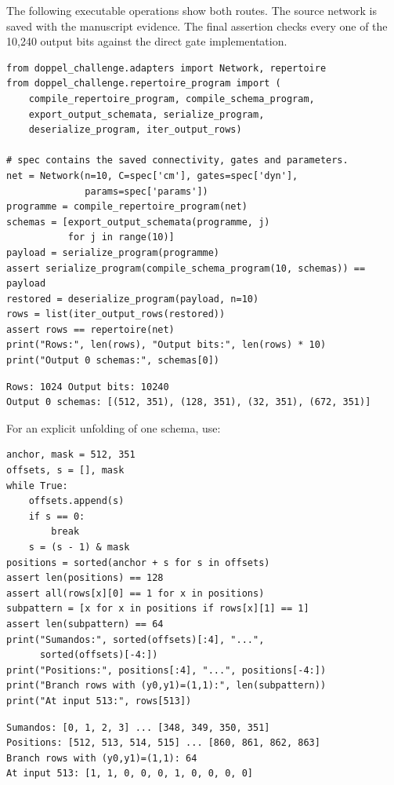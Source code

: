 \documentclass[11pt,a4paper]{article}
\begin{document}
\FloatBarrier
The following executable operations show both routes. The source network is
saved with the manuscript evidence. The final assertion checks every one of
the 10,240 output bits against the direct gate implementation.

\begin{minipage}{\linewidth}
\begin{lstlisting}
from doppel_challenge.adapters import Network, repertoire
from doppel_challenge.repertoire_program import (
    compile_repertoire_program, compile_schema_program,
    export_output_schemata, serialize_program,
    deserialize_program, iter_output_rows)

# spec contains the saved connectivity, gates and parameters.
net = Network(n=10, C=spec['cm'], gates=spec['dyn'],
              params=spec['params'])
programme = compile_repertoire_program(net)
schemas = [export_output_schemata(programme, j)
           for j in range(10)]
payload = serialize_program(programme)
assert serialize_program(compile_schema_program(10, schemas)) == payload
restored = deserialize_program(payload, n=10)
rows = list(iter_output_rows(restored))
assert rows == repertoire(net)
print("Rows:", len(rows), "Output bits:", len(rows) * 10)
print("Output 0 schemas:", schemas[0])
\end{lstlisting}

\begin{lstlisting}[language={}]
Rows: 1024 Output bits: 10240
Output 0 schemas: [(512, 351), (128, 351), (32, 351), (672, 351)]
\end{lstlisting}
\end{minipage}

For an explicit unfolding of one schema, use:

\begin{minipage}{\linewidth}
\begin{lstlisting}
anchor, mask = 512, 351
offsets, s = [], mask
while True:
    offsets.append(s)
    if s == 0:
        break
    s = (s - 1) & mask
positions = sorted(anchor + s for s in offsets)
assert len(positions) == 128
assert all(rows[x][0] == 1 for x in positions)
subpattern = [x for x in positions if rows[x][1] == 1]
assert len(subpattern) == 64
print("Sumandos:", sorted(offsets)[:4], "...",
      sorted(offsets)[-4:])
print("Positions:", positions[:4], "...", positions[-4:])
print("Branch rows with (y0,y1)=(1,1):", len(subpattern))
print("At input 513:", rows[513])
\end{lstlisting}

\begin{lstlisting}[language={}]
Sumandos: [0, 1, 2, 3] ... [348, 349, 350, 351]
Positions: [512, 513, 514, 515] ... [860, 861, 862, 863]
Branch rows with (y0,y1)=(1,1): 64
At input 513: [1, 1, 0, 0, 0, 1, 0, 0, 0, 0]
\end{lstlisting}
\end{minipage}
\end{document}
